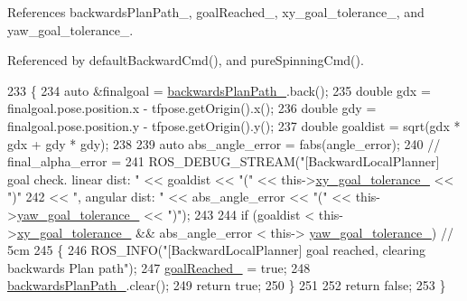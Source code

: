 References backwards\+Plan\+Path\+\_\+, goal\+Reached\+\_\+, xy\+\_\+goal\+\_\+tolerance\+\_\+, and yaw\+\_\+goal\+\_\+tolerance\+\_\+.



Referenced by default\+Backward\+Cmd(), and pure\+Spinning\+Cmd().


\begin{DoxyCode}
233         \{
234             \textcolor{keyword}{auto} &finalgoal = \hyperlink{classcl__move__base__z_1_1backward__local__planner_1_1BackwardLocalPlanner_ad9cde5c85f782cab2ddb4030e3c3f2cf}{backwardsPlanPath\_}.back();
235             \textcolor{keywordtype}{double} gdx = finalgoal.pose.position.x - tfpose.getOrigin().x();
236             \textcolor{keywordtype}{double} gdy = finalgoal.pose.position.y - tfpose.getOrigin().y();
237             \textcolor{keywordtype}{double} goaldist = sqrt(gdx * gdx + gdy * gdy);
238 
239             \textcolor{keyword}{auto} abs\_angle\_error = fabs(angle\_error);
240             \textcolor{comment}{// final\_alpha\_error =}
241             ROS\_DEBUG\_STREAM(\textcolor{stringliteral}{"[BackwardLocalPlanner] goal check. linear dist: "} << goaldist << \textcolor{stringliteral}{"("} << 
      this->\hyperlink{classcl__move__base__z_1_1backward__local__planner_1_1BackwardLocalPlanner_aa4ec2c87947a3c08f8278eff052e7c8c}{xy\_goal\_tolerance\_} << \textcolor{stringliteral}{")"}
242                                                                                 << \textcolor{stringliteral}{", angular dist: "} << 
      abs\_angle\_error << \textcolor{stringliteral}{"("} << this->\hyperlink{classcl__move__base__z_1_1backward__local__planner_1_1BackwardLocalPlanner_a9c5104d328041fcde5a3c02664abad48}{yaw\_goal\_tolerance\_} << \textcolor{stringliteral}{")"});
243 
244             \textcolor{keywordflow}{if} (goaldist < this->\hyperlink{classcl__move__base__z_1_1backward__local__planner_1_1BackwardLocalPlanner_aa4ec2c87947a3c08f8278eff052e7c8c}{xy\_goal\_tolerance\_} && abs\_angle\_error < this->
      \hyperlink{classcl__move__base__z_1_1backward__local__planner_1_1BackwardLocalPlanner_a9c5104d328041fcde5a3c02664abad48}{yaw\_goal\_tolerance\_}) \textcolor{comment}{// 5cm}
245             \{
246                 ROS\_INFO(\textcolor{stringliteral}{"[BackwardLocalPlanner] goal reached, clearing backwards Plan path"});
247                 \hyperlink{classcl__move__base__z_1_1backward__local__planner_1_1BackwardLocalPlanner_ad443c52ef585a8eab0364f0909222f51}{goalReached\_} = \textcolor{keyword}{true};
248                 \hyperlink{classcl__move__base__z_1_1backward__local__planner_1_1BackwardLocalPlanner_ad9cde5c85f782cab2ddb4030e3c3f2cf}{backwardsPlanPath\_}.clear();
249                 \textcolor{keywordflow}{return} \textcolor{keyword}{true};
250             \}
251 
252             \textcolor{keywordflow}{return} \textcolor{keyword}{false};
253         \}
\end{DoxyCode}
